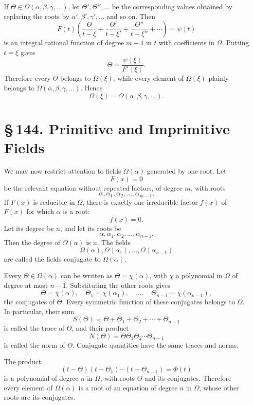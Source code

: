 \documentclass[11pt]{article}
\providecommand{\sect}[2]{\section*{\S\,#1. #2}}
\begin{document}
If $\Theta\in\Omega(\alpha,\beta,\gamma,\ldots)$, let $\Theta',\Theta'',\ldots$ be the corresponding values obtained by replacing the roots by $\alpha',\beta',\gamma',\ldots$ and so on. Then
\[
        F(t)\left(
        \frac{\Theta}{t-\xi}+
        \frac{\Theta'}{t-\xi'}+
        \frac{\Theta''}{t-\xi''}+\cdots
        \right)=\psi(t)
\]
is an integral rational function of degree $m-1$ in $t$ with coefficients in $\Omega$. Putting $t=\xi$ gives
\[
\tag{3}
        \Theta=\frac{\psi(\xi)}{F'(\xi)}.
\]
Therefore every $\Theta$ belongs to $\Omega(\xi)$, while every element of $\Omega(\xi)$ plainly belongs to $\Omega(\alpha,\beta,\gamma,\ldots)$. Hence
\[
        \Omega(\xi)=\Omega(\alpha,\beta,\gamma,\ldots).
\]

\sect{144}{Primitive and Imprimitive Fields}

We may now restrict attention to fields $\Omega(\alpha)$ generated by one root. Let
\[
\tag{1}
        F(x)=0
\]
be the relevant equation without repeated factors, of degree $m$, with roots
\[
\tag{2}
        \alpha,\alpha_1,\alpha_2,\ldots,\alpha_{m-1}.
\]
If $F(x)$ is reducible in $\Omega$, there is exactly one irreducible factor $f(x)$ of $F(x)$ for which $\alpha$ is a root:
\[
\tag{3}
        f(x)=0.
\]
Let its degree be $n$, and let its roots be
\[
\tag{4}
        \alpha,\alpha_1,\alpha_2,\ldots,\alpha_{n-1}.
\]
Then the degree of $\Omega(\alpha)$ is $n$. The fields
\[
\tag{5}
        \Omega(\alpha),\Omega(\alpha_1),\ldots,\Omega(\alpha_{n-1})
\]
are called the fields conjugate to $\Omega(\alpha)$.

Every $\Theta\in\Omega(\alpha)$ can be written as $\Theta=\chi(\alpha)$, with $\chi$ a polynomial in $\Omega$ of degree at most $n-1$. Substituting the other roots gives
\[
\tag{6}
        \Theta=\chi(\alpha),\quad
        \Theta_1=\chi(\alpha_1),\quad\ldots,\quad
        \Theta_{n-1}=\chi(\alpha_{n-1}),
\]
the conjugates of $\Theta$. Every symmetric function of these conjugates belongs to $\Omega$. In particular, their sum
\[
\tag{7}
        S(\Theta)=\Theta+\Theta_1+\Theta_2+\cdots+\Theta_{n-1}
\]
is called the trace of $\Theta$, and their product
\[
\tag{8}
        N(\Theta)=\Theta\Theta_1\Theta_2\cdots\Theta_{n-1}
\]
is called the norm of $\Theta$. Conjugate quantities have the same traces and norms.

The product
\[
\tag{9}
        (t-\Theta)(t-\Theta_1)\cdots(t-\Theta_{n-1})=\Phi(t)
\]
is a polynomial of degree $n$ in $\Omega$, with roots $\Theta$ and its conjugates. Therefore every element of $\Omega(\alpha)$ is a root of an equation of degree $n$ in $\Omega$, whose other roots are its conjugates.
\end{document}

